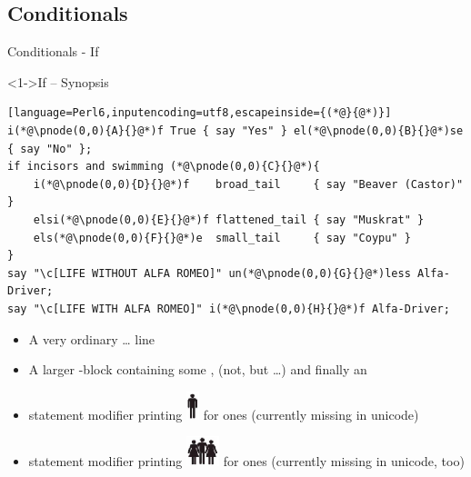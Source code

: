 \subsection{Conditionals}

\begin{frame}[fragile]{Conditionals - If}
\begin{block}<1->{If -- Synopsis}
\small
\begin{lstlisting}[language=Perl6,inputencoding=utf8,escapeinside={(*@}{@*)}]
i(*@\pnode(0,0){A}{}@*)f True { say "Yes" } el(*@\pnode(0,0){B}{}@*)se { say "No" };
if incisors and swimming (*@\pnode(0,0){C}{}@*){
    i(*@\pnode(0,0){D}{}@*)f    broad_tail     { say "Beaver (Castor)" }
    elsi(*@\pnode(0,0){E}{}@*)f flattened_tail { say "Muskrat" }
    els(*@\pnode(0,0){F}{}@*)e  small_tail     { say "Coypu" }
}
say "\c[LIFE WITHOUT ALFA ROMEO]" un(*@\pnode(0,0){G}{}@*)less Alfa-Driver;
say "\c[LIFE WITH ALFA ROMEO]" i(*@\pnode(0,0){H}{}@*)f Alfa-Driver;
\end{lstlisting}
\end{block}

\begin{itemize}
\item<2-> A very ordinary  \ldots {} line
\item<3-> A larger -block containing some ,  (not, but \ldots) and finally an 
\item<4-> statement modifier printing \includegraphics[height=\baselineskip]{Life-without-Alfa-Romeo.eps} for  ones (currently missing in unicode)
\item<5-> statement modifier printing \includegraphics[height=\baselineskip]{Life-with-Alfa-Romeo.eps} for  ones (currently missing in unicode, too)
\end{itemize}
\end{frame}

